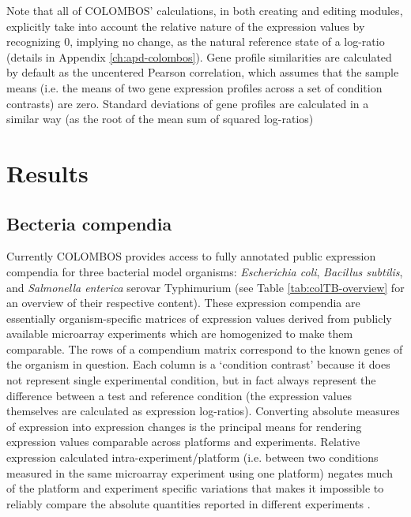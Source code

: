 Note that all of COLOMBOS' calculations, in both creating and editing modules, 
explicitly take into account the relative nature of the expression values by 
recognizing $0$, implying no change, as the natural reference state of a 
log-ratio (details in Appendix \ref{ch:apd-colombos}). 
Gene profile similarities are calculated by default as the uncentered Pearson 
correlation, which assumes that the sample means (i.e. the means of two gene 
expression profiles across a set of condition contrasts) are zero. Standard 
deviations of gene profiles are calculated in a similar way (as the root of the 
mean sum of squared log-ratios)



\section{Results}

\subsection{Becteria compendia}\label{sec:colombos-comp}

Currently COLOMBOS provides access to fully annotated public expression 
compendia for three bacterial model organisms: {\it Escherichia coli}, {\it 
Bacillus subtilis}, and {\it Salmonella enterica} serovar Typhimurium (see 
Table \ref{tab:colTB-overview} for an overview of their respective 
content). 
These expression compendia are essentially organism-specific matrices of 
expression values derived from publicly available microarray experiments which 
are homogenized to make them comparable. The rows of a compendium matrix 
correspond to the known genes of the organism in question. Each column is a 
`condition contrast' because it does not represent single experimental 
condition, but in fact always represent the difference between a 
test and reference condition (the expression values themselves are calculated 
as expression log-ratios). 
%
Converting absolute measures of expression into 
expression changes is the principal means for rendering expression values 
comparable across platforms and experiments. Relative expression calculated 
intra-experiment/platform (i.e. between two conditions measured in the same 
microarray experiment using one platform) negates much of the platform and 
experiment specific variations that makes it impossible to reliably compare the 
absolute quantities reported in different experiments \cite{Shi2006}.

